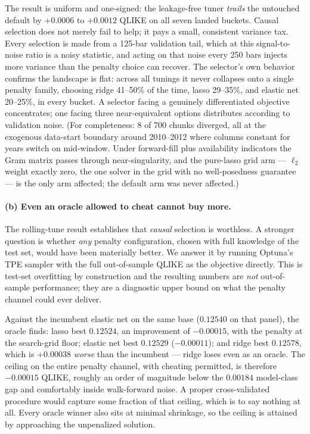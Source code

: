 The result is uniform and one-signed: the leakage-free tuner \emph{trails} the
untouched default by $+0.0006$ to $+0.0012$ QLIKE on all seven landed buckets.
Causal selection does not merely fail to help; it pays a small, consistent
variance tax. Every selection is made from a 125-bar validation tail, which at
this signal-to-noise ratio is a noisy statistic, and acting on that noise every
250 bars injects more variance than the penalty choice can recover. The
selector's own behavior confirms the landscape is flat: across all tunings it
never collapses onto a single penalty family, choosing ridge 41--50\% of the
time, lasso 29--35\%, and elastic net 20--25\%, in every bucket. A selector
facing a genuinely differentiated objective concentrates; one facing three
near-equivalent options distributes according to validation noise. (For
completeness: 8 of 700 chunks diverged, all at the exogenous data-start boundary
around 2010--2012 where columns constant for years switch on mid-window. Under
forward-fill plus availability indicators the Gram matrix passes through
near-singularity, and the pure-lasso grid arm --- $\ell_2$ weight exactly zero,
the one solver in the grid with no well-posedness guarantee --- is the only arm
affected; the default arm was never affected.)

\paragraph{(b) Even an oracle allowed to cheat cannot buy more.}
The rolling-tune result establishes that \emph{causal} selection is worthless. A
stronger question is whether \emph{any} penalty configuration, chosen with full
knowledge of the test set, would have been materially better. We answer it by
running Optuna's TPE sampler \citep{Akiba2019} with the full out-of-sample QLIKE
as the objective directly. This is test-set overfitting by construction and the
resulting numbers are \emph{not} out-of-sample performance; they are a diagnostic
upper bound on what the penalty channel could ever deliver.

Against the incumbent elastic net on the same base ($0.12540$ on that panel), the
oracle finds: lasso best $0.12524$, an improvement of $-0.00015$, with the
penalty at the search-grid floor; elastic net best $0.12529$ ($-0.00011$); and
ridge best $0.12578$, which is $+0.00038$ \emph{worse} than the incumbent ---
ridge loses even as an oracle. The ceiling on the entire penalty channel, with
cheating permitted, is therefore $-0.00015$ QLIKE, roughly an order of magnitude
below the $0.00184$ model-class gap and comfortably inside walk-forward noise. A
proper cross-validated procedure would capture some fraction of that ceiling,
which is to say nothing at all. Every oracle winner also sits at minimal
shrinkage, so the ceiling is attained by approaching the unpenalized solution.

